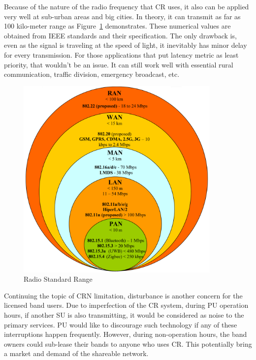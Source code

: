 Because of the nature of the radio frequency that CR uses, it also can be applied very well at sub-urban areas and big cities.
In theory, it can transmit as far as 100 kilo-meter range as Figure~\ref{fig:radio_range} demonstrates. These numerical values are obtained from IEEE standards and their specification. The only drawback
is, even as the signal is traveling at the speed of light, it inevitably has minor delay for every transmission. For those
applications that put latency metric as least priority, that wouldn't be an issue. It can still work well with essential
rural communication, traffic division, emergency broadcast, etc. 


\begin{figure}[ht]
\centering
\includegraphics[width=10cm]{figures/radio_range.png}
\caption{Radio Standard Range \cite{ieee_802_22}}
\label{fig:radio_range}
\end{figure}

Continuing the topic of CRN limitation, disturbance is another concern for the licensed band users. Due to imperfection of
the CR system, during PU operation hours, if another SU is also transmitting, it would be considered as noise to the 
primary services. PU would like to discourage such technology if any of these interruptions happen frequently. However, during non-operation hours, the band owners could sub-lease their bands to anyone who uses CR. This potentially bring a
market and demand of the shareable network.

